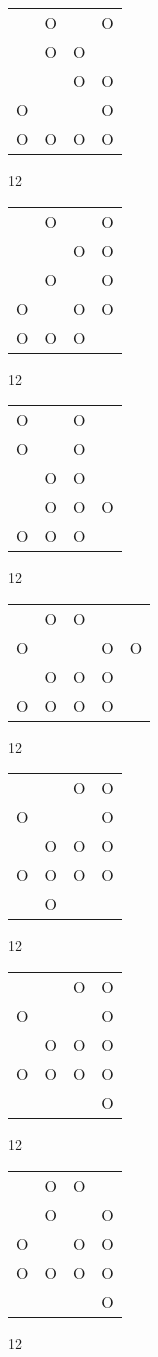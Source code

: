 \begin{tabular}{|m{0.2cm}m{0.2cm}m{0.2cm}m{0.2cm}|}\hline
 &O& &O\\
 &O&O& \\
 & &O&O\\
O& & &O\\
O&O&O&O\\
\hline\end{tabular}12
\begin{tabular}{|m{0.2cm}m{0.2cm}m{0.2cm}m{0.2cm}|}\hline
 &O& &O\\
 & &O&O\\
 &O& &O\\
O& &O&O\\
O&O&O& \\
\hline\end{tabular}12
\begin{tabular}{|m{0.2cm}m{0.2cm}m{0.2cm}m{0.2cm}|}\hline
O& &O& \\
O& &O& \\
 &O&O& \\
 &O&O&O\\
O&O&O& \\
\hline\end{tabular}12
\begin{tabular}{|m{0.2cm}m{0.2cm}m{0.2cm}m{0.2cm}m{0.2cm}|}\hline
 &O&O& & \\
O& & &O&O\\
 &O&O&O& \\
O&O&O&O& \\
\hline\end{tabular}12
\begin{tabular}{|m{0.2cm}m{0.2cm}m{0.2cm}m{0.2cm}|}\hline
 & &O&O\\
O& & &O\\
 &O&O&O\\
O&O&O&O\\
 &O& & \\
\hline\end{tabular}12
\begin{tabular}{|m{0.2cm}m{0.2cm}m{0.2cm}m{0.2cm}|}\hline
 & &O&O\\
O& & &O\\
 &O&O&O\\
O&O&O&O\\
 & & &O\\
\hline\end{tabular}12
\begin{tabular}{|m{0.2cm}m{0.2cm}m{0.2cm}m{0.2cm}|}\hline
 &O&O& \\
 &O& &O\\
O& &O&O\\
O&O&O&O\\
 & & &O\\
\hline\end{tabular}12
